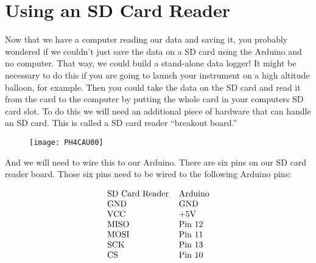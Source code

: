 \section{Using an SD Card Reader}

Now that we have a computer reading our data and saving it, you probably
wondered if we couldn't just save the data on a SD card using the Arduino
and no computer. That way, we could build a stand-alone data logger! It
might be necessary to do this if you are going to launch your instrument on
a high altitude balloon, for example. Then you could take the data on the SD
card and read it from the card to the computer by putting the whole card in
your computers SD card slot. To do this we will need an additional piece of
hardware that can handle an SD card. This is called a SD card reader
\textquotedblleft breakout board.\textquotedblright \begin{figure}[h!]
\texttt{[image: PH4CAU00]}
\end{figure}And we will need to wire this to
our Arduino. There are six pins on our SD card reader board. Those six pins
need to be wired to the following Arduino pins:

\begin{equation*}
\begin{tabular}{ll}
SD Card Reader & Arduino \\ 
GND & GND \\ 
VCC & +5V \\ 
MISO & Pin 12 \\ 
MOSI & Pin 11 \\ 
SCK & Pin 13 \\ 
CS & Pin 10%
\end{tabular}%
\end{equation*}


